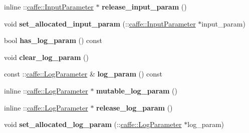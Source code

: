 \begin{DoxyCompactItemize}
\item 
\mbox{\label{classcaffe_1_1_layer_parameter_abc047690391ec9293d5f21433bb229aa}} 
inline \+::\mbox{\hyperlink{classcaffe_1_1_input_parameter}{caffe\+::\+Input\+Parameter}} $\ast$ {\bfseries release\+\_\+input\+\_\+param} ()
\item 
\mbox{\label{classcaffe_1_1_layer_parameter_a39326b02be27b9f4a0dc71d50d7e20a3}} 
void {\bfseries set\+\_\+allocated\+\_\+input\+\_\+param} (\+::\mbox{\hyperlink{classcaffe_1_1_input_parameter}{caffe\+::\+Input\+Parameter}} $\ast$input\+\_\+param)
\item 
\mbox{\label{classcaffe_1_1_layer_parameter_ac2f79f40933d71c1d5865a0622e3cdcc}} 
bool {\bfseries has\+\_\+log\+\_\+param} () const
\item 
\mbox{\label{classcaffe_1_1_layer_parameter_a4d36d5aa346fd1110996ff6dc3e17944}} 
void {\bfseries clear\+\_\+log\+\_\+param} ()
\item 
\mbox{\label{classcaffe_1_1_layer_parameter_aa42a86ed5b146ae83ae79e144ca35cc6}} 
const \+::\mbox{\hyperlink{classcaffe_1_1_log_parameter}{caffe\+::\+Log\+Parameter}} \& {\bfseries log\+\_\+param} () const
\item 
\mbox{\label{classcaffe_1_1_layer_parameter_a7d1b57dd75dbe400dbe5008cc7973897}} 
inline \+::\mbox{\hyperlink{classcaffe_1_1_log_parameter}{caffe\+::\+Log\+Parameter}} $\ast$ {\bfseries mutable\+\_\+log\+\_\+param} ()
\item 
\mbox{\label{classcaffe_1_1_layer_parameter_a4754571205dd97af4f5fb07e2495962f}} 
inline \+::\mbox{\hyperlink{classcaffe_1_1_log_parameter}{caffe\+::\+Log\+Parameter}} $\ast$ {\bfseries release\+\_\+log\+\_\+param} ()
\item 
\mbox{\label{classcaffe_1_1_layer_parameter_ac0319e6c5f58e6c8f51d3ffd570ef7c3}} 
void {\bfseries set\+\_\+allocated\+\_\+log\+\_\+param} (\+::\mbox{\hyperlink{classcaffe_1_1_log_parameter}{caffe\+::\+Log\+Parameter}} $\ast$log\+\_\+param)

\end{DoxyCompactItemize}
